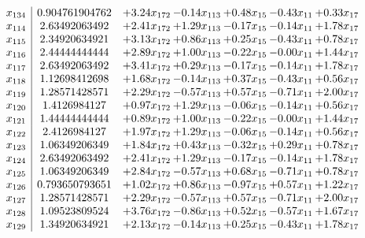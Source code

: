 \documentclass[8pt]{article}
\begin{document}
\[\begin{array}{c| c c@{\hskip 2pt} c@{\hskip 2pt} c@{\hskip 2pt} c@{\hskip 2pt} c@{\hskip 2pt} }
 x_{134}   &  0.904761904762 & +  3.24 x_{172} & -0.14 x_{113} & +  0.48 x_{15} & -0.43 x_{11} & +  0.33 x_{17}\\
 x_{114}   &  2.63492063492 & +  2.41 x_{172} & +  1.29 x_{113} & -0.17 x_{15} & -0.14 x_{11} & +  1.78 x_{17}\\
 x_{115}   &  2.34920634921 & +  3.13 x_{172} & +  0.86 x_{113} & +  0.25 x_{15} & -0.43 x_{11} & +  0.78 x_{17}\\
 x_{116}   &  2.44444444444 & +  2.89 x_{172} & +  1.00 x_{113} & -0.22 x_{15} & -0.00 x_{11} & +  1.44 x_{17}\\
 x_{117}   &  2.63492063492 & +  3.41 x_{172} & +  0.29 x_{113} & -0.17 x_{15} & -0.14 x_{11} & +  1.78 x_{17}\\
 x_{118}   &  1.12698412698 & +  1.68 x_{172} & -0.14 x_{113} & +  0.37 x_{15} & -0.43 x_{11} & +  0.56 x_{17}\\
 x_{119}   &  1.28571428571 & +  2.29 x_{172} & -0.57 x_{113} & +  0.57 x_{15} & -0.71 x_{11} & +  2.00 x_{17}\\
 x_{120}   &  1.4126984127 & +  0.97 x_{172} & +  1.29 x_{113} & -0.06 x_{15} & -0.14 x_{11} & +  0.56 x_{17}\\
 x_{121}   &  1.44444444444 & +  0.89 x_{172} & +  1.00 x_{113} & -0.22 x_{15} & -0.00 x_{11} & +  1.44 x_{17}\\
 x_{122}   &  2.4126984127 & +  1.97 x_{172} & +  1.29 x_{113} & -0.06 x_{15} & -0.14 x_{11} & +  0.56 x_{17}\\
 x_{123}   &  1.06349206349 & +  1.84 x_{172} & +  0.43 x_{113} & -0.32 x_{15} & +  0.29 x_{11} & +  0.78 x_{17}\\
 x_{124}   &  2.63492063492 & +  2.41 x_{172} & +  1.29 x_{113} & -0.17 x_{15} & -0.14 x_{11} & +  1.78 x_{17}\\
 x_{125}   &  1.06349206349 & +  2.84 x_{172} & -0.57 x_{113} & +  0.68 x_{15} & -0.71 x_{11} & +  0.78 x_{17}\\
 x_{126}   &  0.793650793651 & +  1.02 x_{172} & +  0.86 x_{113} & -0.97 x_{15} & +  0.57 x_{11} & +  1.22 x_{17}\\
 x_{127}   &  1.28571428571 & +  2.29 x_{172} & -0.57 x_{113} & +  0.57 x_{15} & -0.71 x_{11} & +  2.00 x_{17}\\
 x_{128}   &  1.09523809524 & +  3.76 x_{172} & -0.86 x_{113} & +  0.52 x_{15} & -0.57 x_{11} & +  1.67 x_{17}\\
 x_{129}   &  1.34920634921 & +  2.13 x_{172} & -0.14 x_{113} & +  0.25 x_{15} & -0.43 x_{11} & +  1.78 x_{17}\\

\end{array}\]
\end{document}
